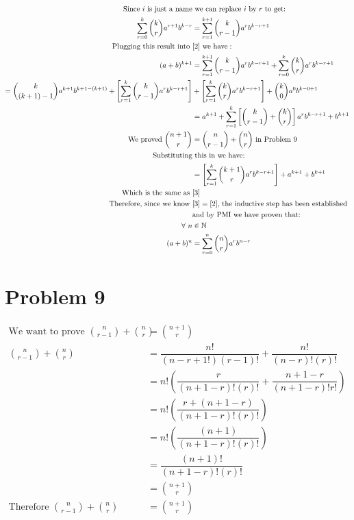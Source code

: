 \documentclass{article}
\begin{document}
\begin{flushleft}
\begin{align*}
\text{Since } i \text{ is just a name}& \text{ we can replace } i \text{ by } r \text{ to get:}\\
\sum \limits_{r=0}^{k}{k \choose r}a^{r+1} b^{k-r}&=\sum \limits_{r=1}^{k+1} {k\choose r-1}a^r b^{k-r+1}\\
\text{Plugging this result into }& \eqref{2} \text{ we have}:\\
(a+b)^{k+1}&=\sum \limits_{r=1}^{k+1}{k \choose r-1}a^{r} b^{k-r+1}+\sum \limits_{r=0}^{k}{k \choose r}a^{r} b^{k-r+1}\\
={k \choose (k+1)-1}a^{k+1} b^{k+1-(k+1)}+\left[\sum \limits_{r=1}^{k}{k \choose r-1}a^{r} b^{k-r+1}\right]&+\left[\sum \limits_{r=1}^{k}{k \choose r}a^{r} b^{k-r+1}\right]+{k \choose 0}a^{0} b^{k-0+1}\\
&=a^{k+1}+ \sum \limits_{r=1}^{k}\left[{k \choose r-1}+{k \choose r}\right]a^rb^{k-r+1}+b^{k+1}\\
\text{We proved } {n+1 \choose r}&={n \choose r-1}+{n \choose r} \text{ in Problem 9}\\
\text{Substituting} &\text{ this in we have:}\\
&=\left[\sum \limits_{r=1}^{k}{k+1 \choose r}a^rb^{k-r+1}\right]+a^{k+1}+b^{k+1}\\
\text{Which is the same as } & \eqref{3}\\
\text{Therefore, since we know }& \eqref{3}=\eqref{2} \text{, the inductive step has been established}\\
&\text{and by PMI we have proven that:}\\
\forall \ n &\in \mathbb{N}\\
(a+b)^n&=\sum \limits_{r=0}^{n}{n \choose r}a^r b^{n-r}
\end{align*}
\pagebreak
\section*{Problem 9}
\begin{align*}
\text{We want to prove } { n\choose r-1}+{n \choose r}&={n+1 \choose r}\\
{n \choose r-1}+{n \choose r}&=\dfrac{n!}{(n-r+1!)(r-1)!}+\dfrac{n!}{(n-r)!(r)!}\\
&=n!\left(\dfrac{r}{(n+1-r)!(r)!}+\dfrac{n+1-r}{(n+1-r)!r!} \right)\\
&=n!\left(\dfrac{r+(n+1-r)}{(n+1-r)!(r)!} \right)\\
&=n!\left(\dfrac{(n+1)}{(n+1-r)!(r)!} \right)\\
&=\dfrac{(n+1)!}{(n+1-r)!(r)!}\\
&={n+1\choose r}\\
\text{Therefore } {n \choose r-1}+{n \choose r}&={n+1 \choose r}
\end{align*}


\end{flushleft}
\end{document}
